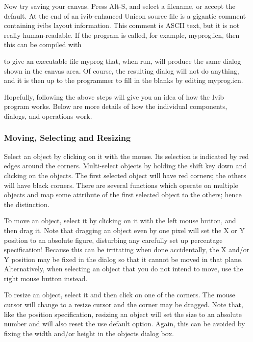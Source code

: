 Now try saving your canvas. Press Alt-S, and select a filename, or
accept the default. At the end of an ivib-enhanced Unicon source file
is a gigantic comment containing ivib{\textquotesingle}s layout
information. This comment is ASCII text, but it is not
really human-readable. If the program is called, for example,
\textsf{myprog.icn}, then this can be compiled with


\noindent
to give an executable file \textsf{myprog} that, when run, will produce
the same dialog shown in the canvas area. Of course, the resulting
dialog will not do anything, and it is then up to the programmer to
fill in the blanks by editing \textsf{myprog.icn}.

Hopefully, following the above steps will give you an idea of how the
Ivib program works. Below are more details of how the individual
components, dialogs, and operations work.

\subsubsection{Moving, Selecting and Resizing}

Select an object by clicking on it with the mouse. Its selection is
indicated by red edges around the corners. Multi-select objects by
holding the shift key down and clicking on the objects. The first
selected object will have red corners; the others will have black
corners. There are several functions which operate on multiple objects
and map some attribute of the first selected object to the others;
hence the distinction.

To move an object, select it by clicking on it with the left mouse
button, and then drag it. Note that dragging an object even by one
pixel will set the X or Y position to an absolute figure, disturbing
any carefully set up percentage specification! Because this can be
irritating when done accidentally, the X and/or Y position may be fixed
in the dialog so that it cannot be moved in that plane. Alternatively,
when selecting an object that you do not intend to move, use the right
mouse button instead.

To resize an object, select it and then click on one of the corners. The
mouse cursor will change to a resize cursor and the corner may be
dragged. Note that, like the position specification, resizing an object
will set the size to an absolute number and will also reset the
{\textquotedbl}use default{\textquotedbl} option. Again, this can be
avoided by fixing the width and/or height in the
object{\textquotesingle}s dialog box.

